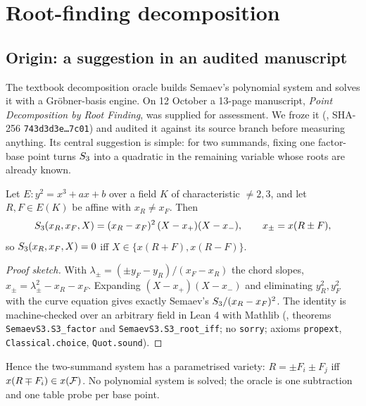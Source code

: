 \section{Root-finding decomposition}\label{sec:rootfinding}

\subsection{Origin: a suggestion in an audited manuscript}

The textbook decomposition oracle builds Semaev's polynomial system and
solves it with a Gr\"obner-basis engine. On 12 October a 13-page manuscript,
\emph{Point Decomposition by Root Finding}, was supplied for assessment. We
froze it (,
SHA-256 \texttt{743d3d3e\ldots7c01}) and audited it against its source
branch before measuring anything. Its central suggestion is simple: for two
summands, fixing one factor-base point turns $S_{3}$ into a quadratic in the
remaining variable whose roots are already known.

\begin{proposition}\label{prop:s3}
Let $E: y^2=x^3+ax+b$ over a field $K$ of characteristic $\ne2,3$, and let
$R,F\in E(K)$ be affine with $x_R\ne x_F$. Then
\[
  S_{3}(x_R,x_F,X)=(x_R-x_F)^2\,(X-x_+)(X-x_-),\qquad
  x_\pm=x(R\pm F),
\]
so $S_{3}(x_R,x_F,X)=0$ iff $X\in\{x(R+F),x(R-F)\}$.
\end{proposition}
\begin{proof}[Proof sketch]
With $\lambda_\pm=(\pm y_F-y_R)/(x_F-x_R)$ the chord slopes,
$x_\pm=\lambda_\pm^2-x_R-x_F$. Expanding $(X-x_+)(X-x_-)$ and eliminating
$y_R^2,y_F^2$ with the curve equation gives exactly Semaev's
$S_{3}/(x_R-x_F)^2$. The identity is machine-checked over an arbitrary
field in Lean 4 with Mathlib (,
theorems \texttt{SemaevS3.S3\_factor} and \texttt{SemaevS3.S3\_root\_iff};
no \texttt{sorry}; axioms \texttt{propext}, \texttt{Classical.choice},
\texttt{Quot.sound}).
\end{proof}

Hence the two-summand system has a parametrised variety: $R=\pm F_i\pm F_j$
iff $x(R\mp F_i)\in x(\mathcal{F})$. No polynomial system is solved; the oracle is
one subtraction and one table probe per base point.

